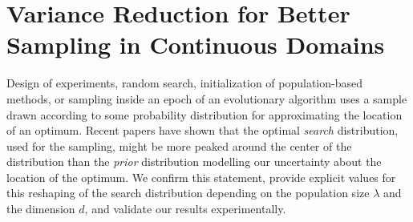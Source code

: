 

 
\chapter{Variance Reduction for Better Sampling in Continuous Domains}
Design of experiments, random search, initialization of population-based methods, or sampling inside an epoch of an evolutionary algorithm uses a sample drawn according to some probability distribution for approximating the location of an optimum. Recent papers have shown that the optimal {\textit{search}} distribution, used for the sampling, might be more peaked around the center of the distribution than the {\textit{prior}} distribution modelling our uncertainty about the location of the optimum.
We confirm this statement, provide explicit values for this reshaping of the search distribution depending on the population size $\lambda$ and the dimension $d$, and validate our results experimentally.

